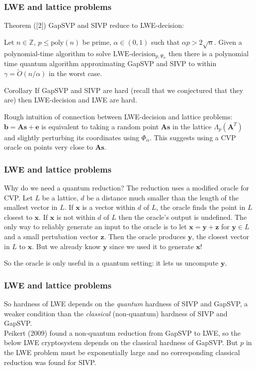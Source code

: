 \documentclass{beamer}
\renewcommand{\v}{\mathbf}
\begin{document}
\begin{frame}
\frametitle{LWE and lattice problems}
\begin{block}{Theorem ([2])}
GapSVP and SIVP reduce to LWE-decision:

Let $n \in \mathbb{Z}$, $p \leq \text{poly}(n)$ be prime,
$\alpha \in (0,1)$ such that $\alpha p > 2 \sqrt{n}$.
Given a polynomial-time algorithm to solve $\text{LWE-decision}_{p,\Psi_\alpha}$ then there is a polynomial time quantum algorithm 
approximating GapSVP and SIVP to within $\gamma = \tilde{O}(n/\alpha)$
in the worst case.
\end{block}
\begin{block}{Corollary}
    If GapSVP and SIVP are hard (recall that we conjectured that they are)
    then LWE-decision and LWE are hard.
\end{block}
\smallskip
Rough intuition of connection between LWE-decision and lattice problems:
$\v{b} = \v{As + e}$ is equivalent to taking a random point $\v{As}$ in the
lattice $\Lambda_p(\v{A}^T)$ and slightly perturbing its coordinates
using $\Phi_\alpha$. This suggests using a CVP oracle on points
very close to $\v{As}$.
\end{frame}

\begin{frame}
\frametitle{LWE and lattice problems}
Why do we need a quantum reduction?
The reduction uses a modified oracle for CVP. Let $L$ be a lattice, 
$d$ be a distance much smaller than the length of the smallest
vector in $L$.
If $\v{x}$ is a vector within $d$ of $L$, the oracle finds the point
in $L$ closest to $\v{x}$. If $\v{x}$ is not within $d$ of $L$ then 
the oracle's output is undefined. The only way to reliably generate an input
to the oracle is to let $\v{x}=\v{y+z}$ for $\v{y} \in L$ and a
small pertubation vector $\v{z}$. Then the oracle produces $\v{y}$,
the closest vector in $L$ to $\v{x}$. But we already know $\v{y}$ since we used
it to generate $\v{x}$!

So the oracle is only useful in a quantum setting: it lets us uncompute
$\v{y}$.
\end{frame}

\begin{frame}
\frametitle{LWE and lattice problems}
So hardness of LWE depends on the \textit{quantum} hardness of
SIVP and GapSVP, a weaker condition than the \textit{classical} (non-quantum)
hardness of SIVP and GapSVP.
\bigskip \\
Peikert (2009) found a non-quantum reduction from GapSVP to LWE, so
the below LWE cryptosystem depends on the classical hardness of GapSVP.
But $p$ in the LWE problem must be exponentially large and no 
corresponding classical reduction was found for SIVP.
\end{frame}
\end{document}

